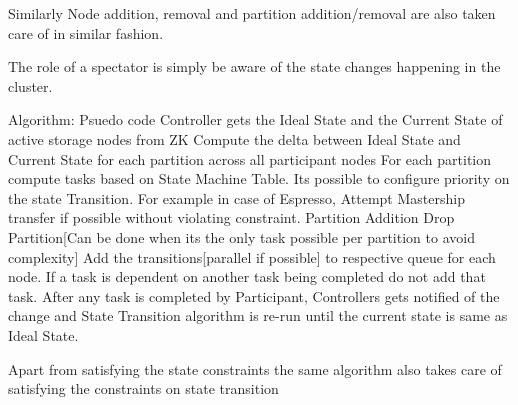{Similarly Node addition, removal and partition addition/removal are
also taken care of in similar fashion.


The role of a spectator is simply be aware of the state changes
happening in the cluster.

Algorithm: Psuedo code Controller gets the Ideal State and the Current
State of active storage nodes from ZK Compute the delta between Ideal
State and Current State for each partition across all participant
nodes For each partition compute tasks based on State Machine
Table. Its possible to configure priority on the state Transition. For
example in case of Espresso, Attempt Mastership transfer if possible
without violating constraint.  Partition Addition Drop Partition[Can
be done when its the only task possible per partition to avoid
complexity] Add the transitions[parallel if possible] to respective
queue for each node.  If a task is dependent on another task being
completed do not add that task.  After any task is completed by
Participant, Controllers gets notified of the change and State
Transition algorithm is re-run until the current state is same as
Ideal State.

Apart from satisfying the state constraints the same algorithm also
takes care of satisfying the constraints on state transition
}%


